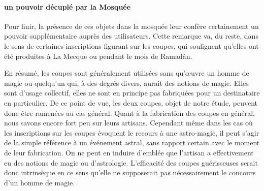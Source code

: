 \paragraph{un pouvoir décuplé par la Mosquée}
Pour finir, la présence de ces objets dans la mosquée leur confère certainement un pouvoir supplémentaire auprès des utilisateurs. Cette remarque va, du reste, dans le sens de certaines inscriptions figurant sur les coupes, qui soulignent qu'elles ont été produites à La Mecque ou pendant le mois de Ramadân.
\begin{Synthesis}
    En résumé, les coupes sont généralement utilisées sans qu'œuvre un homme de magie ou quelqu'un qui, à des degrés divers, aurait des notions de magie. Elles sont d'usage collectif, elles ne sont en principe pas fabriquées pour un destinataire en particulier. De ce point de vue, les deux coupes, objet de notre étude, peuvent donc être ramenées au cas général.
Quant à la fabrication des coupes en général, nous savons encore fort peu sur leurs artisans. Cependant même dans les cas où les inscriptions sur les coupes évoquent le recours à une astro-magie, il peut s'agir de la simple référence à un événement astral, sans rapport certain avec le moment de leur fabrication. On ne peut en induire d'emblée que l'artisan a effectivement eu des notions de magie ou d'astrologie. L'efficacité des coupes guérisseuses serait donc intrinsèque en ce sens qu'elle ne supposerait pas nécessairement le concours d'un homme de magie.
\end{Synthesis}

